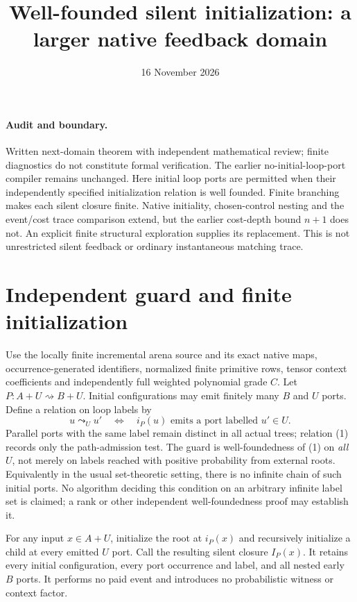 \documentclass[11pt]{article}
\title{Well-founded silent initialization: a larger native feedback domain}
\date{16 November 2026}
\begin{document}
\maketitle
\paragraph{Audit and boundary.} Written next-domain theorem with independent mathematical review; finite diagnostics do not constitute formal verification. The earlier no-initial-loop-port compiler remains unchanged. Here initial loop ports are permitted when their independently specified initialization relation is well founded. Finite branching makes each silent closure finite. Native initiality, chosen-control nesting and the event/cost trace comparison extend, but the earlier cost-depth bound $n+1$ does not. An explicit finite structural exploration supplies its replacement. This is not unrestricted silent feedback or ordinary instantaneous matching trace.

\section{Independent guard and finite initialization}
Use the locally finite incremental arena source and its exact native maps, occurrence-generated identifiers, normalized finite primitive rows, tensor context coefficients and independently full weighted polynomial grade $C$. Let $P:A+U\rightsquigarrow B+U$. Initial configurations may emit finitely many $B$ and $U$ ports. Define a relation on loop labels by
\[
 u\mathrel{\leadsto_U}u'\quad\Longleftrightarrow\quad
 i_P(u)\text{ emits a port labelled }u'\in U.                \tag{1}
\]
Parallel ports with the same label remain distinct in all actual trees; relation (1) records only the path-admission test. The guard is well-foundedness of (1) on \emph{all} $U$, not merely on labels reached with positive probability from external roots. Equivalently in the usual set-theoretic setting, there is no infinite chain of such initial ports. No algorithm deciding this condition on an arbitrary infinite label set is claimed; a rank or other independent well-foundedness proof may establish it.

For any input $x\in A+U$, initialize the root at $i_P(x)$ and recursively initialize a child at every emitted $U$ port. Call the resulting silent closure $I_P(x)$. It retains every initial configuration, every port occurrence and label, and all nested early $B$ ports. It performs no paid event and introduces no probabilistic witness or context factor.
\end{document}
